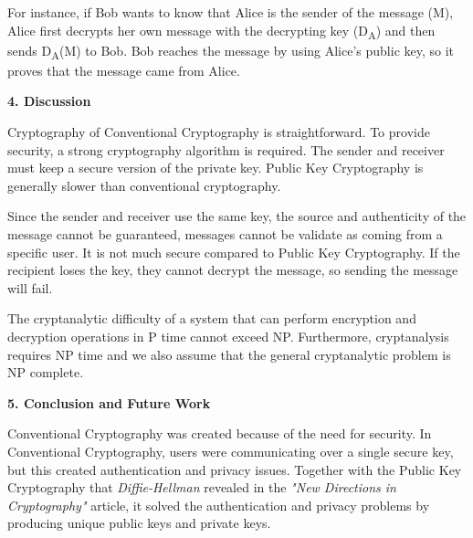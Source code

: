 \documentclass{article}
\begin{document}
\begin{flushleft}
\hspace{1cm} For instance, if Bob wants to know that Alice is the sender of the message (M), Alice first decrypts her own message with the decrypting key (D\textsubscript{A}) and then sends D\textsubscript{A}(M) to Bob. Bob reaches the message by using Alice's public key, so it proves that the message came from Alice. 

\vspace{5mm} 

\textbf{4. Discussion} \newline 

\hspace{0.5cm} Cryptography of Conventional Cryptography is straightforward. To provide security, a strong cryptography algorithm is required. The sender and receiver must keep a secure version of the private key. Public Key Cryptography is generally slower than conventional cryptography. \newline

\hspace{0.5cm} Since the sender and receiver use the same key, the source and authenticity of the message cannot be guaranteed, messages cannot be validate as coming from a specific user. It is not much secure compared to Public Key Cryptography. If the recipient loses the key, they cannot decrypt the message, so sending the message will fail.\newline

\hspace{0.5cm} The cryptanalytic difficulty of a system that can perform encryption and decryption operations in P time cannot exceed NP. Furthermore, cryptanalysis requires NP time and we also assume that the general cryptanalytic problem is NP complete.

\vspace{5mm}

\textbf{5. Conclusion and Future Work} \newline 

\hspace{0.5cm} Conventional Cryptography was created because of the need for security. In Conventional Cryptography, users were communicating over a single secure key, but this created authentication and privacy issues. Together with the Public Key Cryptography that \textit{Diffie-Hellman} revealed in the \textit{"New Directions in Cryptography"} article, it solved the authentication and privacy problems by producing unique public keys and private keys. \newline


\end{flushleft}
\end{document}
